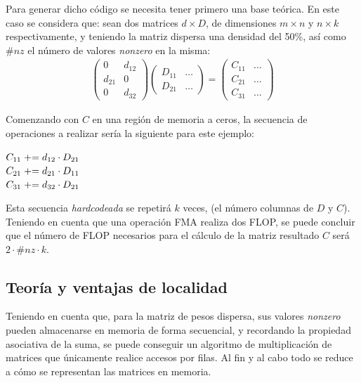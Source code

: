 Para generar dicho código se necesita tener primero una base teórica. En este caso se considera que: sean dos matrices $d \times D$, de dimensiones $m \times n$ y $n \times k$ respectivamente, y teniendo la matriz dispersa una densidad del 50\%, así como $\#nz$ el número de valores \textit{nonzero} en la misma:
\begin{gather}
    \begin{pmatrix}
        0 & d_{12}\\
        d_{21} & 0\\
        0 & d_{32}
    \end{pmatrix}	
    \begin{pmatrix}
        D_{11} & \dots\\
        D_{21} & \dots
    \end{pmatrix}
    =
    \begin{pmatrix}
        C_{11} & \dots\\
        C_{21} & \dots\\
        C_{31} & \dots
    \end{pmatrix} \nonumber %
\end{gather}

Comenzando con $C$ en una región de memoria a ceros, la secuencia de operaciones a realizar sería la siguiente para este ejemplo:
\begin{center}
    $C_{11} \mathrel{+}= d_{12} \cdot D_{21}$\\
    $C_{21} \mathrel{+}= d_{21} \cdot D_{11}$\\
    $C_{31} \mathrel{+}= d_{32} \cdot D_{21}$\\
\end{center}

Esta secuencia \textit{hardcodeada} se repetirá $k$ veces, (el número columnas de $D$ y $C$). Teniendo en cuenta que una operación FMA realiza dos FLOP, se puede concluir que el número de FLOP necesarios para el cálculo de la matriz resultado $C$ será $2 \cdot \#nz \cdot k$.

\subsection{Teoría y ventajas de localidad}
\label{ssec:teoria_ventajas_localidad}
Teniendo en cuenta que, para la matriz de pesos dispersa, sus valores \textit{nonzero} pueden almacenarse en memoria de forma secuencial, y recordando la propiedad asociativa de la suma, se puede conseguir un algoritmo de multiplicación de matrices que únicamente realice accesos por filas. Al fin y al cabo todo se reduce a cómo se representan las matrices en memoria.

